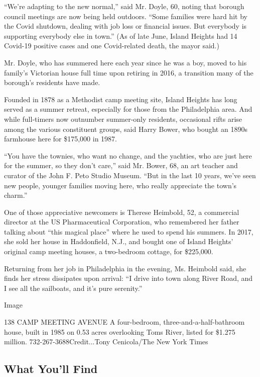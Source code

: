 ``We're adapting to the new normal,'' said Mr. Doyle, 60, noting that
borough council meetings are now being held outdoors. ``Some families
were hard hit by the Covid shutdown, dealing with job loss or financial
issues. But everybody is supporting everybody else in town.'' (As of
late June, Island Heights had 14 Covid-19 positive cases and one
Covid-related death, the mayor said.)

Mr. Doyle, who has summered here each year since he was a boy, moved to
his family's Victorian house full time upon retiring in 2016, a
transition many of the borough's residents have made.

Founded in 1878 as a Methodist camp meeting site, Island Heights has
long served as a summer retreat, especially for those from the
Philadelphia area. And while full-timers now outnumber summer-only
residents, occasional rifts arise among the various constituent groups,
said Harry Bower, who bought an 1890s farmhouse here for \$175,000 in
1987.

``You have the townies, who want no change, and the yachties, who are
just here for the summer, so they don't care,'' said Mr. Bower, 68, an
art teacher and curator of the John F. Peto Studio Museum. ``But in the
last 10 years, we've seen new people, younger families moving here, who
really appreciate the town's charm.''

One of those appreciative newcomers is Therese Heimbold, 52, a
commercial director at the US Pharmaceutical Corporation, who remembered
her father talking about ``this magical place'' where he used to spend
his summers. In 2017, she sold her house in Haddonfield, N.J., and
bought one of Island Heights' original camp meeting houses, a
two-bedroom cottage, for \$225,000.

Returning from her job in Philadelphia in the evening, Ms. Heimbold
said, she finds her stress dissipates upon arrival: ``I drive into town
along River Road, and I see all the sailboats, and it's pure serenity.''

Image

138 CAMP MEETING AVENUE \textbar{} A four-bedroom,
three-and-a-half-bathroom house, built in 1985 on 0.53 acres overlooking
Toms River, listed for \$1.275 million. 732-267-3688Credit...Tony
Cenicola/The New York Times

\hypertarget{what-youll-find}{%
\subsection{What You'll Find}\label{what-youll-find}}

